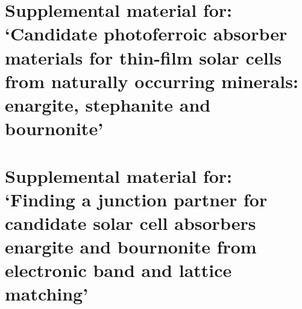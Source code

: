 \documentclass[11pt, twoside]{report}
\begin{document}
\section{Supplemental material for: `Candidate photoferroic absorber materials for thin-film solar cells from naturally occurring minerals: enargite, stephanite and bournonite'}\label{App_sulfosalts1}



\section{Supplemental material for: `Finding a junction partner for candidate solar cell absorbers enargite and bournonite from electronic band and lattice matching'}\label{jp_appendix}



\end{document}
